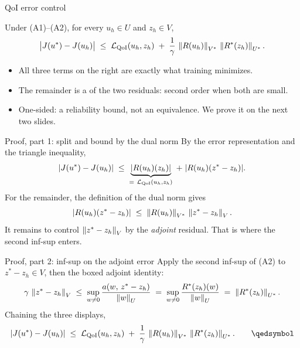 \documentclass[11pt,aspectratio=169]{beamer}
\begin{document}
\begin{frame}{QoI error control}
  \begin{theorem}
    Under (A1)--(A2), for every $u_h \in U$ and $z_h \in V$,
    \[
      \bigl| J(u^*) - J(u_h) \bigr|
        \;\le\;
        \mathcal{L}_{\mathrm{QoI}}(u_h, z_h)
        \;+\;
        \frac{1}{\gamma}\,\left\|R(u_h)\right\|_{V^*}\,\left\|R^{*}(z_h)\right\|_{U^*} .
    \]
  \end{theorem}
  \medskip
  \begin{itemize}\itemsep0.4em
    \item All three terms on the right are exactly what training minimizes.
    \item The remainder is a  of the two residuals: second
          order when both are small.
    \item \alert{One-sided}: a reliability bound, not an equivalence. We prove it
          on the next two slides.
  \end{itemize}
\end{frame}

\begin{frame}{Proof, part 1: split and bound by the dual norm}
  By the error representation and the triangle inequality,
  \[
    |J(u^*) - J(u_h)|
      \;\le\; \underbrace{|R(u_h)(z_h)|}_{=\ \mathcal{L}_{\mathrm{QoI}}(u_h,z_h)}
      \;+\; |R(u_h)(z^* - z_h)| .
  \]
  \medskip
  For the remainder, the definition of the dual norm gives
  \[
    |R(u_h)(z^* - z_h)|
      \;\le\; \left\|R(u_h)\right\|_{V^*}\,\left\|z^* - z_h\right\|_V .
  \]
  \medskip
  It remains to control $\left\|z^* - z_h\right\|_V$ by the \emph{adjoint} residual. That
  is where the second inf-sup enters.
\end{frame}

\begin{frame}{Proof, part 2: inf-sup on the adjoint error}
  Apply the second inf-sup of (A2) to $z^* - z_h \in V$, then the boxed adjoint
  identity:
  \[
    \gamma\,\left\|z^* - z_h\right\|_V
      \;\le\; \sup_{w \ne 0} \frac{a(w,\, z^* - z_h)}{\left\|w\right\|_U}
      \;=\; \sup_{w \ne 0} \frac{R^{*}(z_h)(w)}{\left\|w\right\|_U}
      \;=\; \left\|R^{*}(z_h)\right\|_{U^*} .
  \]
  \medskip
  Chaining the three displays,
  \[
    |J(u^*) - J(u_h)|
      \;\le\; \QoI(u_h, z_h)
      \;+\; \frac{1}{\gamma}\,\norm{\Res(u_h)}_{V^*}\,\norm{\Resad(z_h)}_{U^*} .
      \qquad\qedsymbol
  \]
\end{frame}
\end{document}
